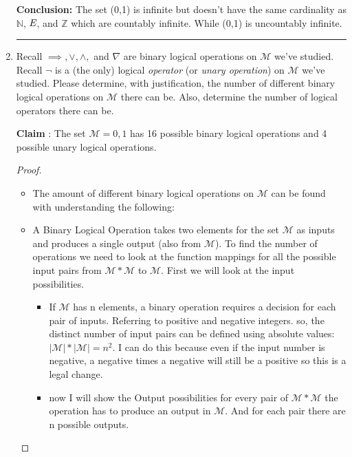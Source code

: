 \documentclass[10pt, AMS Euler]{article}
\newcommand{\Z}{\mathbb{Z}}
\newcommand{\N}{\mathbb{N}}
\begin{document}
\begin{enumerate}
\begin{proof}
\begin{itemize}
\begin{itemize}
                        \end{itemize}
                    \end{itemize}
            \end{proof}
        \item[\bf{Conclusion}:] The set (0,1) is infinite but doesn't have the same cardinality as $\N$, $\emph{E}$, and $\Z$ which are countably infinite. While (0,1) is uncountably infinite. \\
\noindent\rule{\textwidth}{0.4pt}
        \item Recall $\implies, \vee, \wedge,$ and $\nabla$ are binary logical operations on $\mathcal{M}$ we've studied. Recall $\neg$ is a (the only) logical \emph{operator} (or \emph{unary operation}) on $\mathcal{M}$ we've studied. Please determine, with justification, the number of different binary logical operations on $\mathcal{M}$ there can be. Also, determine the number of logical operators there can be.  
        \item[\bf{Claim}]: The set $\mathcal{M} = {0,1}$ has 16 possible binary logical operations and 4 possible unary logical operations. 
            \begin{proof}
                \begin{itemize}
                    \item The amount of different binary logical operations on $\mathcal{M}$ can be found with understanding the following:
                    \item A Binary Logical Operation takes two elements for the set $\mathcal{M}$ as inputs and produces a single output (also from $\mathcal{M}$). To find the number of operations we need to look at the function mappings for all the possible input pairs from $\mathcal{M}*\mathcal{M}$ to $\mathcal{M}$. First we will look at the input possibilities.
                    \begin{itemize}
                        \item If $\mathcal{M}$ has n elements, a binary operation requires a decision for each pair of inputs. Referring to positive and negative integers. so, the distinct number of input pairs can be defined using absolute values: $|\mathcal{M}| * |\mathcal{M}| = n^{2}$. I can do this because even if the input number is negative, a negative times a negative will still be a positive so this is a legal change. 
                        \item now I will show the Output possibilities for every pair of $\mathcal{M} * \mathcal{M}$ the operation has to produce an output in $\mathcal{M}$. And for each pair there are n possible outputs. 

\end{itemize}
\end{itemize}
\end{proof}
\end{enumerate}
\end{document}
